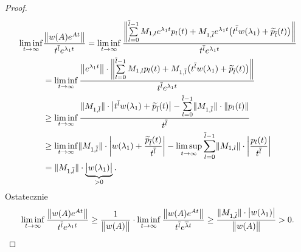 \begin{proof}
%
  \begin{align*}
    \liminf_{t\to\infty} &\frac{\norm[\big]{w(A) e^{At}}}{t^{\overline{l}} e^{\lambda_1 t}} =
    \liminf_{t\to\infty} \frac{\norm[\bigg]{\sum\limits_{l=0}^{\overline{l}-1} M_{1,l} e^{\lambda_1 t} 
    p_l(t) + 
    M_{1,\overline{l}} e^{\lambda_1 t} \p[\big]{t^{\overline{l}} w(\lambda_1) + \widetilde{p}_{\overline{l}} (t)} }} 
    {t^{\overline{l}} e^{\lambda_1 t}} \\
    &= \liminf_{t\to\infty} \frac{\norm[\big]{e^{\lambda_1 t}} \cdot 
    \norm[\bigg]{\sum\limits_{l=0}^{\overline{l}-1} 
    M_{1,l} 
    p_l(t) + M_{1,\overline{l}} \p[\big]{t^{\overline{l}} w(\lambda_1) + \widetilde{p}_{\overline{l}} (t)} }} 
    {t^{\overline{l}} e^{\lambda_1 t}} \\
    &\geq \liminf_{t\to\infty} \frac{ \norm{M_{1,\overline{l}}} \cdot \abs[\big]{ t^{\overline{l}} w(\lambda_1) + 
    \widetilde{p}_{\overline{l}}(t) } - \sum\limits_{l=0}^{\overline{l}-1} \norm{M_{1,\overline{l}}} \cdot 
    \norm{p_l(t)} }{t^{\overline{l}}} \\
    &\geq \liminf_{t\to\infty} \norm{M_{1,\overline{l}}} \cdot \abs*{w(\lambda_1) + 
    \frac{\widetilde{p}_{\overline{l}}(t)}{t^{\overline{l}}}} - \limsup_{t\to\infty} \sum_{l=0}^{\overline{l}-1} 
    \norm{M_{1,l}} \cdot \abs*{\frac{p_l(t)}{t^{\overline{l}}}} \\ 
    &= \norm{M_{1,\overline{l}}} \cdot 
    \underbrace{\abs[\big]{w(\lambda_1)}}_{>0}.
  \end{align*}
%
  Ostatecznie
%
  \begin{equation*}
    \liminf_{t\to\infty} \frac{\norm[\big]{w(A) e^{At}}}{t^{\overline{l}} e^{\lambda_1 t}} \geq 
    \frac{1}{\norm[\big]{w(A)}} \cdot \liminf_{t\to\infty} \frac{\norm[\big]{w(A) e^{At}}}{t^{\overline{l}} 
    e^{\overline{\lambda} t}} \geq \frac{\norm{M_{1,\overline{l}}} \cdot \abs[\big]{w(\lambda_1)}}{\norm[\big]{w(A)}}
    >0. \qedhere
  \end{equation*}
\end{proof}

































